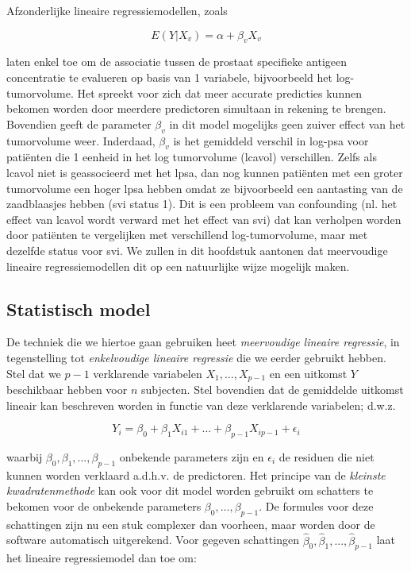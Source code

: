 \documentclass[12pt,dutch,coursenotes]{book}
\theoremstyle{definition}
\theoremstyle{definition}
\theoremstyle{definition}
\theoremstyle{remark}
\begin{document}
Afzonderlijke lineaire regressiemodellen, zoals

\[E(Y|X_v)=\alpha+\beta_v X_v\]

laten enkel toe om de associatie tussen de prostaat specifieke antigeen
concentratie te evalueren op basis van 1 variabele, bijvoorbeeld het
log-tumorvolume. Het spreekt voor zich dat meer accurate predicties
kunnen bekomen worden door meerdere predictoren simultaan in rekening te
brengen. Bovendien geeft de parameter \(\beta_v\) in dit model mogelijks
geen zuiver effect van het tumorvolume weer. Inderdaad, \(\beta_v\) is
het gemiddeld verschil in log-psa voor patiënten die 1 eenheid in het
log tumorvolume (lcavol) verschillen. Zelfs als lcavol niet is
geassocieerd met het lpsa, dan nog kunnen patiënten met een groter
tumorvolume een hoger lpsa hebben omdat ze bijvoorbeeld een aantasting
van de zaadblaasjes hebben (svi status 1). Dit is een probleem van
confounding (nl. het effect van lcavol wordt verward met het effect van
svi) dat kan verholpen worden door patiënten te vergelijken met
verschillend log-tumorvolume, maar met dezelfde status voor svi. We
zullen in dit hoofdstuk aantonen dat meervoudige lineaire
regressiemodellen dit op een natuurlijke wijze mogelijk maken.

\subsection{Statistisch model}\label{statistisch-model}

De techniek die we hiertoe gaan gebruiken heet \emph{meervoudige
lineaire regressie}, in tegenstelling tot \emph{enkelvoudige lineaire
regressie} die we eerder gebruikt hebben. Stel dat we \(p-1\)
verklarende variabelen \(X_1,...,X_{p-1}\) en een uitkomst \(Y\)
beschikbaar hebben voor \(n\) subjecten. Stel bovendien dat de
gemiddelde uitkomst lineair kan beschreven worden in functie van deze
verklarende variabelen; d.w.z.

\begin{equation}  
Y_i =\beta_0 + \beta_1 X_{i1} + ... +\beta_{p-1} X_{ip-1} + \epsilon_i
\end{equation}

waarbij \(\beta_0,\beta_1,...,\beta_{p-1}\) onbekende parameters zijn en
\(\epsilon_i\) de residuen die niet kunnen worden verklaard a.d.h.v. de
predictoren. Het principe van de \emph{kleinste kwadratenmethode} kan
ook voor dit model worden gebruikt om schatters te bekomen voor de
onbekende parameters \(\beta_0, \ldots, \beta_{p-1}\). De formules voor
deze schattingen zijn nu een stuk complexer dan voorheen, maar worden
door de software automatisch uitgerekend. Voor gegeven schattingen
\(\hat{\beta}_0,\hat{\beta}_1,...,\hat{\beta}_{p-1}\) laat het lineaire
regressiemodel dan toe om:
\end{document}
